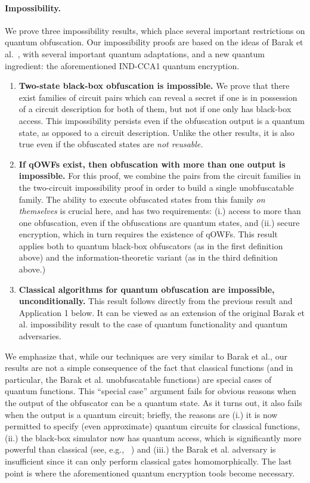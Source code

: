 \documentclass[11pt]{article}
\numberwithin{equation}{section}
\begin{document}
{\paragraph{Impossibility.} We prove three impossibility results, which place several important restrictions on quantum obfuscation. Our impossibility proofs are based on the ideas of Barak et al.~\cite{BGIRSVY12}, with several important quantum adaptations, and a new quantum ingredient: the aforementioned IND-CCA1 quantum encryption.
\begin{enumerate}
\item \textbf{Two-state black-box obfuscation is impossible.} We prove that there exist families of circuit pairs which can reveal a secret if one is in possession of a circuit description for both of them, but not if one only has black-box access. This impossibility persists even if the obfuscation output is a quantum state, as opposed to a circuit description. Unlike the other results, it is also true even if the obfuscated states are \emph{not reusable.}
\item \textbf{If qOWFs exist, then obfuscation with more than one output is impossible.} For this proof, we combine the pairs from the circuit families in the two-circuit impossibility proof in order to build a single unobfuscatable family. The ability to execute obfuscated states from this family \emph{on themselves} is crucial here, and has two requirements: (i.) access to more than one obfuscation, even if the obfuscations are quantum states, and (ii.) secure encryption, which in turn requires the existence of qOWFs. This result applies both to quantum black-box obfuscators (as in the first definition above) and the information-theoretic variant (as in the third definition above.) 
\item \textbf{Classical algorithms for quantum obfuscation are impossible, unconditionally.} This result follows directly from the previous result and Application 1 below. It can be viewed as an extension of the original Barak et al. impossibility result to the case of quantum functionality and quantum adversaries.
\end{enumerate}
We emphasize that, while our techniques are very similar to Barak et al., our results are not a simple consequence of the fact that classical functions (and in particular, the Barak et al. unobfuscatable functions) are special cases of quantum functions. This ``special case'' argument fails for obvious reasons when the output of the obfuscator can be a quantum state. As it turns out, it also fails when the output is a quantum circuit; briefly, the reasons are (i.) it is now permitted to specify (even approximate) quantum circuits for classical functions, (ii.) the black-box simulator now has quantum access, which is significantly more powerful than classical (see, e.g., ~\cite{HR14}) and (iii.) the Barak et al. adversary is insufficient since it can only perform classical gates homomorphically. The last point is where the aforementioned quantum encryption tools become necessary.


}
\end{document}
